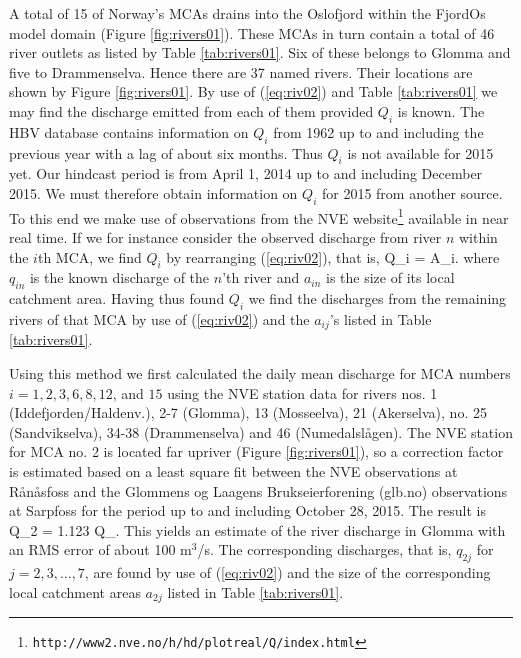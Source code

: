 A total of 15 of Norway's MCAs drains into the Oslofjord within the FjordOs model domain (Figure \ref{fig:rivers01}). These MCAs in turn contain a total of 46 river outlets as listed by Table \ref{tab:rivers01}. Six of these belongs to Glomma and five to Drammenselva. Hence there are 37 named rivers. Their locations are shown by Figure \ref{fig:rivers01}. By use of (\ref{eq:riv02}) and Table \ref{tab:rivers01} we may find the discharge emitted from each of them provided $Q_i$ is known. The HBV database contains information on $Q_i$ from 1962 up to and including the previous year with a lag of about six months. Thus $Q_i$ is not available for 2015 yet. Our hindcast period is from April 1, 2014 up to and including December 2015. We must therefore obtain information on $Q_i$ for 2015 from another source. To this end we make use of observations from the NVE website\footnote{\texttt{http://www2.nve.no/h/hd/plotreal/Q/index.html}} available in near real time. If we for instance consider the observed discharge from river $n$ within the $i$th MCA, we find $Q_i$ by rearranging (\ref{eq:riv02}), that is,
\be
 \label{eq:riv03}
  Q_i = A_i.
\ee
where $q_{in}$ is the known discharge of the $n$'th river and $a_{in}$ is the size of its local catchment area. Having thus found $Q_i$ we find the discharges from the remaining rivers of that MCA by use of (\ref{eq:riv02}) and the $a_{ij}$'s listed in Table \ref{tab:rivers01}.

Using this method we first calculated the daily mean discharge for MCA numbers $i=1, 2, 3, 6, 8, 12$, and $15$ using the NVE station data for rivers nos. 1 (Iddefjorden/Haldenv.), 2-7 (Glomma), 13 (Mosseelva), 21 (Akerselva), no. 25 (Sandvikselva), 34-38 (Drammenselva) and 46 (Numedalsl{\aa}gen). The NVE station for MCA no. 2 is located far upriver (Figure \ref{fig:rivers01}), so a correction factor is estimated based on a least square fit between the NVE observations at R{\aa}n{\aa}sfoss and the Glommens og Laagens Brukseierforening (glb.no) observations at Sarpfoss for the period up to and including October 28, 2015. The result is
\be
 \label{eq:riv04}
 Q_2 = 1.123 \cdot Q_{}.
\ee
This yields an estimate of the river discharge in Glomma with an RMS error of about 100 m$^3$/s. The corresponding discharges, that is, $q_{2j}$ for $j=2,3,\ldots,7$, are found by use of (\ref{eq:riv02}) and the size of the corresponding local catchment areas $a_{2j}$ listed in Table \ref{tab:rivers01}.


